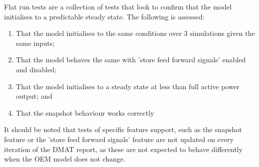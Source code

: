 Flat run tests are a collection of tests that look to confirm that the model initialises to a predictable steady state. The following is assessed:
\begin{enumerate}
	\item That the model initialises to the same conditions over 3 simulations given the same inputs;
	\item That the model behaves the same with 'store feed forward signals' enabled and disabled;
	\item That the model initialises to a steady state at less than full active power output; and
	\item That the snapshot behaviour works correctly
\end{enumerate}

It should be noted that tests of specific feature support, such as the snapshot feature or the 'store feed forward signals' feature are not updated on every iteration of the DMAT report, as these are not expected to behave differently when the OEM model does not change.